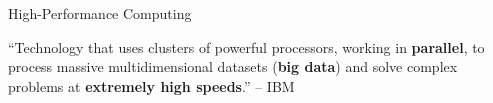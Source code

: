 \documentclass[10pt,aspectratio=169]{beamer}
\begin{document}
\begin{frame}{High-Performance Computing}
    \begin{displayquote}
        \vspace{0.2cm}
        ``Technology that uses clusters of powerful processors, working in \textbf{parallel}, to process massive multidimensional datasets (\textbf{big data}) and solve complex problems at \textbf{extremely high speeds}.'' -- IBM \cite{WhatHPCIntroduction}
    \end{displayquote}
\end{frame}
\end{document}
